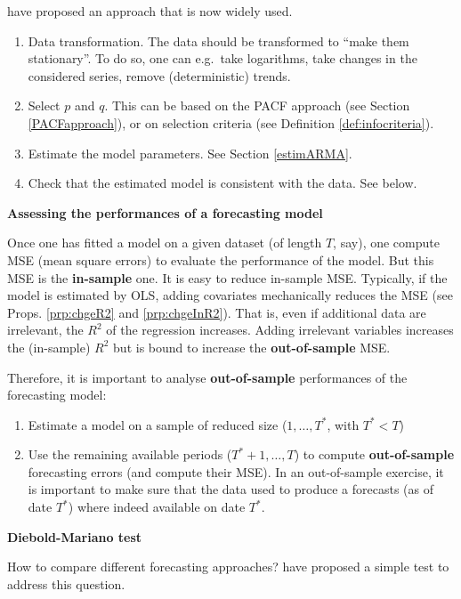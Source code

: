 \documentclass[
  12pt,
]{book}
\providecommand{\tightlist}{%
  \setlength{\itemsep}{0pt}\setlength{\parskip}{0pt}}
\theoremstyle{definition}
\theoremstyle{definition}
\theoremstyle{definition}
\theoremstyle{definition}
\theoremstyle{remark}
\begin{document}
\citet{boxjen76} have proposed an approach that is now widely used.

\begin{enumerate}
\def\labelenumi{\arabic{enumi}.}
\tightlist
\item
  Data transformation. The data should be transformed to ``make them stationary''. To do so, one can e.g.~take logarithms, take changes in the considered series, remove (deterministic) trends.
\item
  Select \(p\) and \(q\). This can be based on the PACF approach (see Section \ref{PACFapproach}), or on selection criteria (see Definition \ref{def:infocriteria}).
\item
  Estimate the model parameters. See Section \ref{estimARMA}.
\item
  Check that the estimated model is consistent with the data. See below.
\end{enumerate}

\textbf{Assessing the performances of a forecasting model}

Once one has fitted a model on a given dataset (of length \(T\), say), one compute MSE (mean square errors) to evaluate the performance of the model. But this MSE is the \textbf{in-sample} one. It is easy to reduce in-sample MSE. Typically, if the model is estimated by OLS, adding covariates mechanically reduces the MSE (see Props. \ref{prp:chgeR2} and \ref{prp:chgeInR2}). That is, even if additional data are irrelevant, the \(R^2\) of the regression increases. Adding irrelevant variables increases the (in-sample) \(R^2\) but is bound to increase the \textbf{out-of-sample} MSE.

Therefore, it is important to analyse \textbf{out-of-sample} performances of the forecasting model:

\begin{enumerate}
\def\labelenumi{\alph{enumi}.}
\tightlist
\item
  Estimate a model on a sample of reduced size (\(1,\dots,T^*\), with \(T^*<T\))
\item
  Use the remaining available periods (\(T^*+1,\dots,T\)) to compute \textbf{out-of-sample} forecasting errors (and compute their MSE). In an out-of-sample exercise, it is important to make sure that the data used to produce a forecasts (as of date \(T^*\)) where indeed available on date \(T^*\).
\end{enumerate}

\textbf{Diebold-Mariano test}

How to compare different forecasting approaches? \citet{Diebold_Mariano_1995} have proposed a simple test to address this question.
\end{document}
